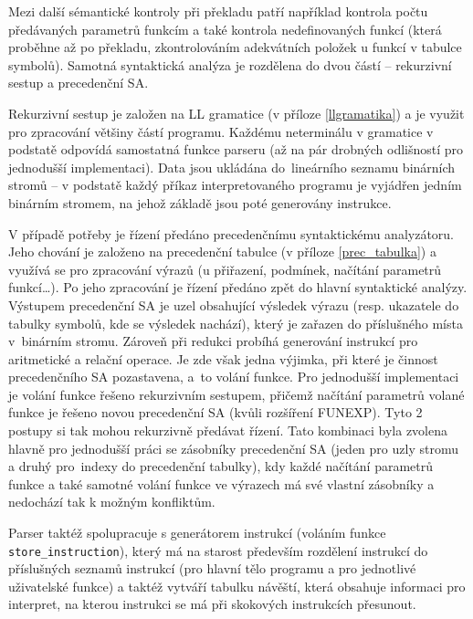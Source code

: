 \documentclass[12pt,a4paper,titlepage,final]{article}
\begin{document}
Mezi další sémantické kontroly při překladu patří například kontrola počtu 
předávaných parametrů funkcím a také kontrola nedefinovaných funkcí (která 
proběhne až po překladu, zkontrolováním adekvátních položek u funkcí 
v tabulce symbolů). Samotná syntaktická analýza je rozdělena do dvou 
částí – rekurzivní sestup a precedenční SA.

Rekurzivní sestup je založen na LL gramatice (v příloze \ref{llgramatika}) 
a je využit pro zpracování většiny částí programu. Každému neterminálu 
v gramatice v podstatě odpovídá samostatná funkce parseru (až na pár drobných 
odlišností pro jednodušší implementaci). Data jsou ukládána do~lineárního 
seznamu binárních stromů – v podstatě každý příkaz interpretovaného programu je 
vyjádřen jedním binárním stromem, na jehož základě jsou poté generovány 
instrukce. 

V případě potřeby je řízení předáno precedenčnímu syntaktickému analyzátoru. 
Jeho chování je založeno na precedenční tabulce (v příloze \ref{prec_tabulka}) 
a využívá se pro zpracování výrazů (u přiřazení, podmínek, načítání parametrů 
funkcí\dots). Po jeho zpracování je řízení předáno zpět do hlavní syntaktické 
analýzy. Výstupem precedenční SA je uzel obsahující výsledek výrazu (resp. 
ukazatele do tabulky symbolů, kde se výsledek nachází), který je zařazen 
do příslušného místa v~binárním stromu. Zároveň při redukci probíhá generování 
instrukcí pro aritmetické a relační operace. Je zde však jedna výjimka, 
při které je činnost precedenčního SA pozastavena, a~to volání funkce. 
Pro jednodušší implementaci je volání funkce řešeno rekurzivním sestupem, 
přičemž načítání parametrů volané funkce je řešeno novou precedenční SA (kvůli 
rozšíření FUN\-EXP). Tyto 2 postupy si tak mohou rekurzivně předávat řízení. 
Tato kombinaci byla zvolena hlavně pro jednodušší práci se zásobníky precedenční 
SA (jeden pro uzly stromu a druhý pro~indexy do precedenční tabulky), kdy 
každé načítání parametrů funkce a také samotné volání funkce ve výrazech má 
své vlastní zásobníky a nedochází tak k možným konfliktům.

Parser taktéž spolupracuje s generátorem instrukcí (voláním funkce 
\texttt{store\_instruction}), který má na starost především rozdělení instrukcí 
do příslušných seznamů instrukcí (pro hlavní tělo programu a pro jednotlivé 
uživatelské funkce) a taktéž vytváří tabulku návěští, která obsahuje 
informaci pro interpret, na kterou instrukci se má při skokových instrukcích 
přesunout.
\end{document}

